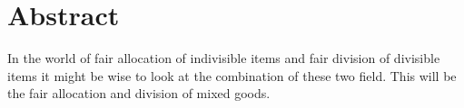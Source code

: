 \chapter{Abstract}\label{chp:abstract}

In the world of fair allocation of indivisible items and fair division of divisible items it might be wise to look at the combination of these two field. This will be the fair allocation and division of mixed goods.